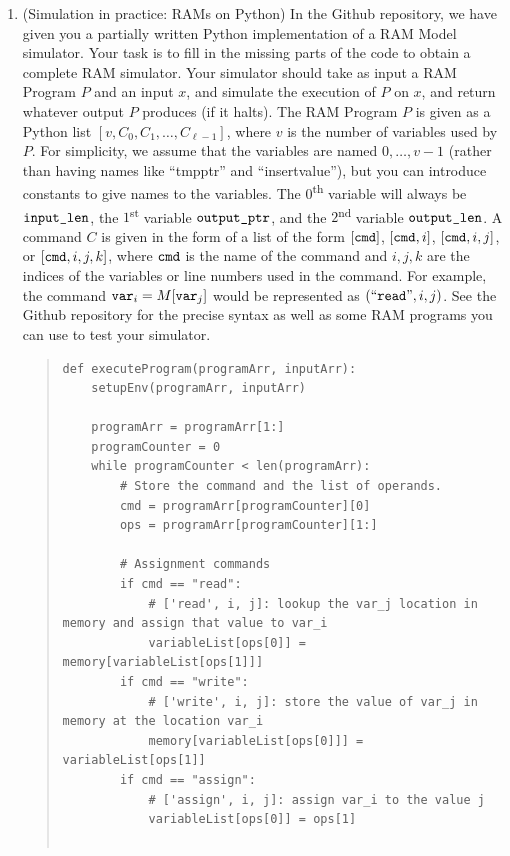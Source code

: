 \documentclass[11pt]{article}
\begin{document}
\begin{enumerate}
 
    \item (Simulation in practice: RAMs on Python)  
    In the Github repository, we have given you a partially written Python implementation of a RAM Model simulator.  Your task is to fill in the missing parts of the code to obtain a complete RAM simulator.
     Your simulator should take as input a RAM Program $P$ and an input $x$, and simulate the execution of $P$ on $x$, and return whatever output $P$ produces (if it halts).  The RAM Program $P$ is given as a Python list $[v,C_0,C_1,\ldots,C_{\ell-1}]$, where $v$ is the number of variables used by $P$.  For simplicity, we assume that the variables are named $0,\ldots,v-1$ (rather than having names like ``tmpptr'' and ``insertvalue''), but you can introduce constants to give names to the variables.  The $0$\textsuperscript{th} variable will always be $\texttt{input\_len}$, the $1$\textsuperscript{st} variable $\texttt{output\_ptr}$, and the $2$\textsuperscript{nd} variable $\texttt{output\_len}$.  A command $C$ is given in the form of a list of the form $[\texttt{cmd}]$, $[\texttt{cmd},i]$, $[\texttt{cmd},i,j]$, or $[\texttt{cmd},i,j,k]$, where $\texttt{cmd}$ is the name of the command and $i,j,k$ are the indices of the variables or line numbers used in the command.  For example,  the command $\texttt{var}_i = M[\texttt{var}_j]$ would be represented as $(``\texttt{read}",i,j)$.  See the Github repository for the precise syntax as well as some RAM programs you can use to test your simulator.

     \begin{quote}
         \color{purple}
         \begin{verbatim}
def executeProgram(programArr, inputArr):
    setupEnv(programArr, inputArr)

    programArr = programArr[1:]
    programCounter = 0
    while programCounter < len(programArr):
        # Store the command and the list of operands.
        cmd = programArr[programCounter][0]
        ops = programArr[programCounter][1:]

        # Assignment commands
        if cmd == "read":
            # ['read', i, j]: lookup the var_j location in memory and assign that value to var_i
            variableList[ops[0]] = memory[variableList[ops[1]]]
        if cmd == "write":
            # ['write', i, j]: store the value of var_j in memory at the location var_i
            memory[variableList[ops[0]]] = variableList[ops[1]]
        if cmd == "assign":
            # ['assign', i, j]: assign var_i to the value j
            variableList[ops[0]] = ops[1]


\end{verbatim}
\end{quote}
\end{enumerate}
\end{document}
